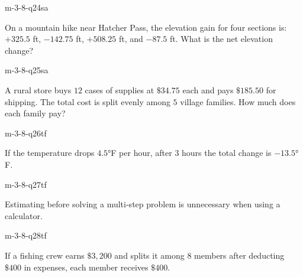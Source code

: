 \begin{practiceQuestion}{m-3-8-q24}{sa}
\begin{questionText}
On a mountain hike near Hatcher Pass, the elevation gain for four sections is: $+325.5$ ft, $-142.75$ ft, $+508.25$ ft, and $-87.5$ ft. What is the net elevation change?
\end{questionText}
\end{practiceQuestion}

\begin{practiceQuestion}{m-3-8-q25}{sa}
\begin{questionText}
A rural store buys $12$ cases of supplies at $\$34.75$ each and pays $\$185.50$ for shipping. The total cost is split evenly among $5$ village families. How much does each family pay?
\end{questionText}
\end{practiceQuestion}


\begin{practiceQuestion}{m-3-8-q26}{tf}
\begin{questionText}
If the temperature drops $4.5°$F per hour, after $3$ hours the total change is $-13.5°$F.
\end{questionText}
\end{practiceQuestion}

\begin{practiceQuestion}{m-3-8-q27}{tf}
\begin{questionText}
Estimating before solving a multi-step problem is unnecessary when using a calculator.
\end{questionText}
\end{practiceQuestion}

\begin{practiceQuestion}{m-3-8-q28}{tf}
\begin{questionText}
If a fishing crew earns $\$3{,}200$ and splits it among $8$ members after deducting $\$400$ in expenses, each member receives $\$400$.
\end{questionText}
\end{practiceQuestion}

